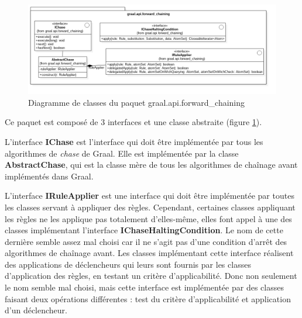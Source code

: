         \begin{figure}[H]
        \centering
        \vspace{-20pt}
        \includegraphics[width=\textwidth]{pictures/diag_class_api_forward_chaining.png}
        \vspace{-35pt}
        \caption{Diagramme de classes du paquet graal.api.forward\_chaining}
        \label{fig:dclasse_api_forward_chaining}
        \end{figure}
        Ce paquet est composé de 3 interfaces et une classe abstraite (figure \ref{fig:dclasse_api_forward_chaining}).
        \par L'interface \textbf{IChase} est l'interface qui doit être implémentée par tous les algorithmes de \textit{chase} de Graal. Elle est implémentée par la classe \textbf{AbstractChase}, qui est la classe mère de tous les algorithmes de chaînage avant implémentés dans Graal.
        \par L'interface \textbf{IRuleApplier} est une interface qui doit être implémentée par toutes les classes servant à appliquer des règles. Cependant, certaines classes appliquant les règles ne les applique pas totalement d'elles-même, elles font appel à une des classes implémentant l'interface \textbf{IChaseHaltingCondition}. Le nom de cette dernière semble assez mal choisi car il ne s'agit pas d'une condition d'arrêt des algorithmes de chaînage avant. Les classes implémentant cette interface réalisent des applications de déclencheurs qui leurs sont fournis par les classes d'application des règles, en testant un critère d'applicabilité. Donc non seulement le nom semble mal choisi, mais cette interface est implémentée par des classes faisant deux opérations différentes : test du critère d'applicabilité et application d'un déclencheur.
        
